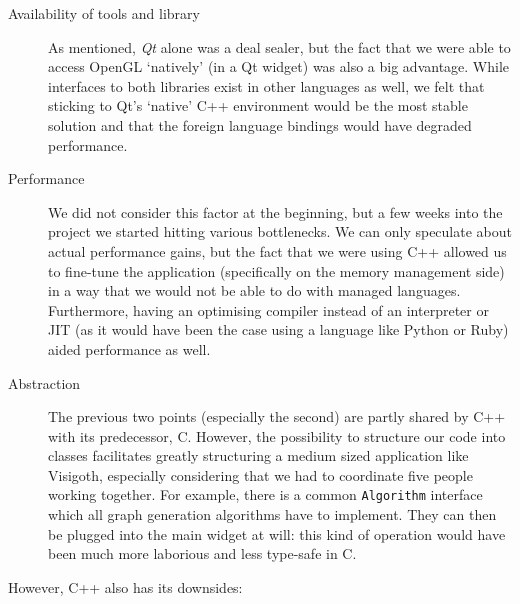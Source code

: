 \documentclass[a4paper,11pt,titlepage]{article}
\newcommand{\code}[1]{\texttt{#1}}
\newcommand{\buzz}[1]{\emph{#1}}
\begin{document}
\begin{description}

\item [Availability of tools and library] As mentioned, \buzz{Qt} alone
  was a deal sealer, but the fact that we were able to access OpenGL
  `natively' (in a Qt widget) was also a big advantage. While interfaces
  to both libraries exist in other languages as well, we felt that
  sticking to Qt's `native' C++ environment would be the most stable
  solution and that the foreign language bindings would have degraded
  performance.

\item [Performance] We did not consider this factor at the beginning,
  but a few weeks into the project we started hitting various
  bottlenecks. We can only speculate about actual performance gains,
  but the fact that we were using
  C++ allowed us to fine-tune the application (specifically on the
  memory management side) in a way that we would not be able to do
  with managed languages. Furthermore, having an optimising compiler
  instead of an interpreter or JIT (as it would have been the case
  using a language like Python or Ruby) aided performance as well.

\item [Abstraction] The previous two points (especially the second)
  are partly shared by C++ with its predecessor, C. However, the
  possibility to structure our code into classes facilitates greatly
  structuring a medium sized application like Visigoth, especially
  considering that we had to coordinate five people working together.
  For example, there is a common \code{Algorithm} interface which all
  graph generation algorithms have to implement. They can then
  be plugged into the main widget at will: this kind of operation
  would have been much more laborious and less type-safe in C.

\end{description}

However, C++ also has its downsides:
\end{document}
